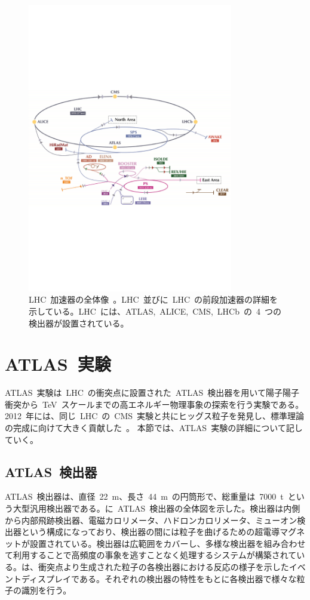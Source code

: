 \begin{figure}[tbp]
        \centering   
        \includegraphics[width=0.8\textwidth]{img/jpeg/lhclhc.pdf}
        \caption[LHC 加速器の全体像]{LHC~加速器の全体像~\cite{URL:01}。LHC~並びに~LHC~の前段加速器の詳細を示している。LHC~には、ATLAS,~ALICE,~CMS,~LHCb~の~4~つの検出器が設置されている。}\label{fig:lhc}
\end{figure}
\section{ATLAS~実験}
ATLAS~実験は~LHC~の衝突点に設置された~ATLAS~検出器を用いて陽子陽子衝突から~TeV~スケールまでの高エネルギー物理事象の探索を行う実験である。2012~年には、同じ~LHC~の~CMS~実験と共にヒッグス粒子を発見し、標準理論の完成に向けて大きく貢献した~\cite{TR:03,TR:03a}。
本節では、ATLAS~実験の詳細について記していく。
\subsection{ATLAS~検出器}
ATLAS~検出器は、直径~22~m、長さ~44~m~の円筒形で、総重量は~7000~t~という大型汎用検出器である。に~ATLAS~検出器の全体図を示した。検出器は内側から内部飛跡検出器、電磁カロリメータ、ハドロンカロリメータ、ミューオン検出器という構成になっており、検出器の間には粒子を曲げるための超電導マグネットが設置されている。検出器は広範囲をカバーし、多様な検出器を組み合わせて利用することで高頻度の事象を逃すことなく処理するシステムが構築されている。は、衝突点より生成された粒子の各検出器における反応の様子を示したイベントディスプレイである。それぞれの検出器の特性をもとに各検出器で様々な粒子の識別を行う。

